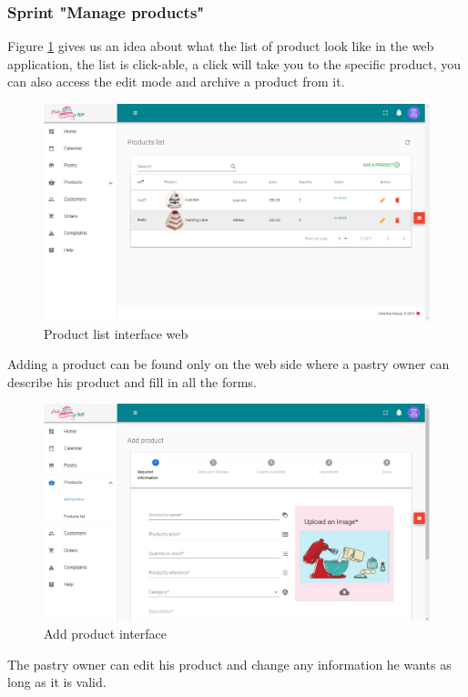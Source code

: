 \documentclass[12pt,a4paper]{report}
\begin{document}
\subsubsection*{Sprint "Manage products"}
Figure \ref{productlist-interface} gives us an idea about what the list of product look like in the web application, the list is click-able, a click will take you to the specific product, you can also access the edit mode and archive a product from it.
\begin{figure}[H]
	\centering
	\includegraphics[width=6in,keepaspectratio]{productlist.png}
	\caption{Product list interface web}
	\label{productlist-interface}
\end{figure} 
Adding a product can be found only on the web side where a pastry owner can describe his product and fill in all the forms.
\begin{figure}[H]
	\centering
	\includegraphics[width=5.5in,keepaspectratio]{addproduct.png}
	\caption{Add product interface}
	\label{addproduct-interface}
\end{figure} 
The pastry owner can edit his product and change any information he wants as long as it is valid.
\end{document}
